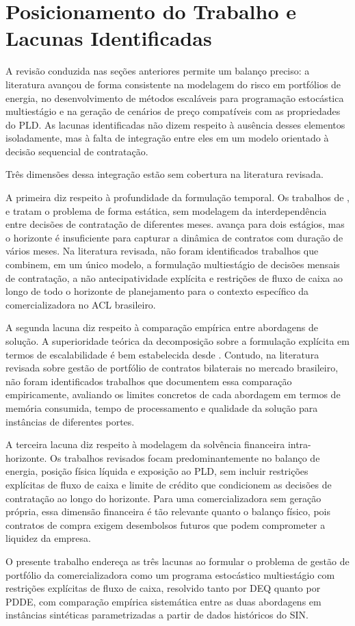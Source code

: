 \section{Posicionamento do Trabalho e Lacunas Identificadas}
\label{sec:rl_posicionamento}

A revisão conduzida nas seções anteriores permite um balanço preciso: a literatura avançou de forma consistente na modelagem do risco em portfólios de energia, no desenvolvimento de métodos escaláveis para programação estocástica multiestágio e na geração de cenários de preço compatíveis com as propriedades do PLD. As lacunas identificadas não dizem respeito à ausência desses elementos isoladamente, mas à falta de integração entre eles em um modelo orientado à decisão sequencial de contratação.

Três dimensões dessa integração estão sem cobertura na literatura revisada.

A primeira diz respeito à profundidade da formulação temporal. Os trabalhos de \cite{guerreiro2017}, \cite{gunn2012} e \cite{munhoz2018} tratam o problema de forma estática, sem modelagem da interdependência entre decisões de contratação de diferentes meses.  avança para dois estágios, mas o horizonte é insuficiente para capturar a dinâmica de contratos com duração de vários meses. Na literatura revisada, não foram identificados trabalhos que combinem, em um único modelo, a formulação multiestágio de decisões mensais de contratação, a não antecipatividade explícita e restrições de fluxo de caixa ao longo de todo o horizonte de planejamento para o contexto específico da comercializadora no ACL brasileiro.

A segunda lacuna diz respeito à comparação empírica entre abordagens de solução. A superioridade teórica da decomposição sobre a formulação explícita em termos de escalabilidade é bem estabelecida desde \cite{pereira1991}. Contudo, na literatura revisada sobre gestão de portfólio de contratos bilaterais no mercado brasileiro, não foram identificados trabalhos que documentem essa comparação empiricamente, avaliando os limites concretos de cada abordagem em termos de memória consumida, tempo de processamento e qualidade da solução para instâncias de diferentes portes.

A terceira lacuna diz respeito à modelagem da solvência financeira intra-horizonte. Os trabalhos revisados focam predominantemente no balanço de energia, posição física líquida e exposição ao PLD, sem incluir restrições explícitas de fluxo de caixa e limite de crédito que condicionem as decisões de contratação ao longo do horizonte. Para uma comercializadora sem geração própria, essa dimensão financeira é tão relevante quanto o balanço físico, pois contratos de compra exigem desembolsos futuros que podem comprometer a liquidez da empresa.

O presente trabalho endereça as três lacunas ao formular o problema de gestão de portfólio da comercializadora como um programa estocástico multiestágio com restrições explícitas de fluxo de caixa, resolvido tanto por DEQ quanto por PDDE, com comparação empírica sistemática entre as duas abordagens em instâncias sintéticas parametrizadas a partir de dados históricos do SIN.
